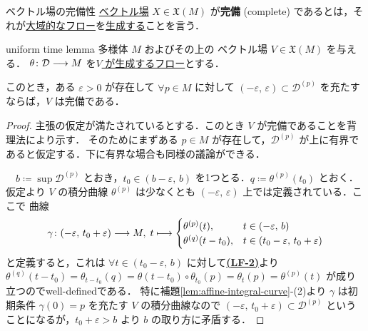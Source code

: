 \documentclass[TQFT_main]{subfiles}
\begin{document}
\begin{mydef}[label=def:complete-vecf]{ベクトル場の完備性}
    \hyperref[def:vecf]{\cinfty ベクトル場} $X \in \mathfrak{X}(M)$ が\textbf{完備} (complete) であるとは，それが\hyperref[def:global-flow]{大域的なフロー}を\hyperref[thm:fundamental-flow]{生成する}ことを言う．
\end{mydef}

\begin{mylem}[label=lem:uniformtime]{uniform time lemma}
    \cinfty 多様体 $M$ およびその上の \cinfty ベクトル場 $V \in \mathfrak{X}(M)$ を与える．
    $\theta \colon \mathcal{D} \longrightarrow M$ を\hyperref[thm:fundamental-flow]{$V$ が生成するフロー}とする．

    このとき，ある $\varepsilon > 0$ が存在して $\forall p \in M$ に対して $(-\varepsilon,\, \varepsilon) \subset \mathcal{D}^{(p)}$ を充たすならば，$V$ は完備である．
\end{mylem}

\begin{proof}
    主張の仮定が満たされているとする．このとき $V$ が完備であることを背理法により示す．
    そのためにまずある $p \in M$ が存在して，$\mathcal{D}^{(p)}$ が上に有界であると仮定する．下に有界な場合も同様の議論ができる．

    　$b \coloneqq \sup \mathcal{D}^{(p)}$ とおき，$t_0 \in (b - \varepsilon,\, b)$ を1つとる．$q \coloneqq \theta^{(p)} (t_0)$ とおく．
    仮定より $V$ の積分曲線 $\theta^{(p)}$ は少なくとも $(-\varepsilon,\, \varepsilon)$ 上では定義されている．ここで \cinfty 曲線
    \begin{align}
        \gamma \colon (-\varepsilon,\, t_0 + \varepsilon) \longrightarrow M,\; 
        t \longmapsto \begin{cases}
            \theta^{(p)}(t), &t \in (-\varepsilon,\, b) \\
            \theta^{(q)}(t-t_0), &t \in (t_0-\varepsilon,\, t_0 + \varepsilon)
        \end{cases}
    \end{align}
    と定義すると，これは $\forall t \in (t_0-\varepsilon,\, b)$ に対して\hyperref[def:local-flow]{\textbf{\textsf{(LF-2)}}}より $\theta^{(q)} (t-t_0) = \theta_{t-t_0}(q) = \theta(t-t_0) \circ \theta_{t_0} (p) = \theta_t (p) = \theta^{(p)} (t)$ が成り立つのでwell-definedである．
    特に補題\ref{lem:affine-integral-curve}-(2)より $\gamma$ は初期条件 $\gamma(0) = p$ を充たす $V$ の積分曲線なので $(-\varepsilon,\, t_0 + \varepsilon) \subset \mathcal{D}^{(p)}$ ということになるが，$t_0 + \varepsilon > b$ より $b$ の取り方に矛盾する．
\end{proof}
\end{document}
